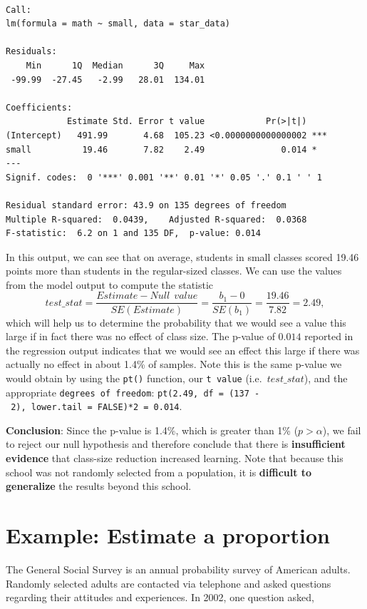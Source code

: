 \documentclass[
  letterpaper,
  DIV=11,
  numbers=noendperiod]{scrreprt}
\theoremstyle{definition}
\theoremstyle{remark}
\begin{document}
\begin{verbatim}

Call:
lm(formula = math ~ small, data = star_data)

Residuals:
    Min      1Q  Median      3Q     Max 
 -99.99  -27.45   -2.99   28.01  134.01 

Coefficients:
            Estimate Std. Error t value            Pr(>|t|)    
(Intercept)   491.99       4.68  105.23 <0.0000000000000002 ***
small          19.46       7.82    2.49               0.014 *  
---
Signif. codes:  0 '***' 0.001 '**' 0.01 '*' 0.05 '.' 0.1 ' ' 1

Residual standard error: 43.9 on 135 degrees of freedom
Multiple R-squared:  0.0439,    Adjusted R-squared:  0.0368 
F-statistic:  6.2 on 1 and 135 DF,  p-value: 0.014
\end{verbatim}

In this output, we can see that on average, students in small classes
scored 19.46 points more than students in the regular-sized classes. We
can use the values from the model output to compute the statistic
\[test\_stat = \frac{Estimate - Null \ \ value}{SE(Estimate)} = \frac{b_1 - 0}{SE(b_1)} = \frac{19.46}{7.82} = 2.49,\]
which will help us to determine the probability that we would see a
value this large if in fact there was no effect of class size. The
p-value of \(0.014\) reported in the regression output indicates that we
would see an effect this large if there was actually no effect in about
1.4\% of samples. Note this is the same p-value we would obtain by using
the \texttt{pt()} function, our \texttt{t\ value} (i.e.~\(test\_stat\)),
and the appropriate \texttt{degrees\ of\ freedom}:
\texttt{pt(2.49,\ df\ =\ (137\ -\ 2),\ lower.tail\ =\ FALSE)*2\ =\ 0.014}.

\textbf{Conclusion}: Since the p-value is 1.4\%, which is greater than
1\% (\(p > \alpha\)), we fail to reject our null hypothesis and
therefore conclude that there is \textbf{insufficient evidence} that
class-size reduction increased learning. Note that because this school
was not randomly selected from a population, it is \textbf{difficult to
generalize} the results beyond this school.

\hypertarget{example-estimate-a-proportion}{%
\section{Example: Estimate a
proportion}\label{example-estimate-a-proportion}}

The General Social Survey is an annual probability survey of American
adults. Randomly selected adults are contacted via telephone and asked
questions regarding their attitudes and experiences. In 2002, one
question asked,
\end{document}
